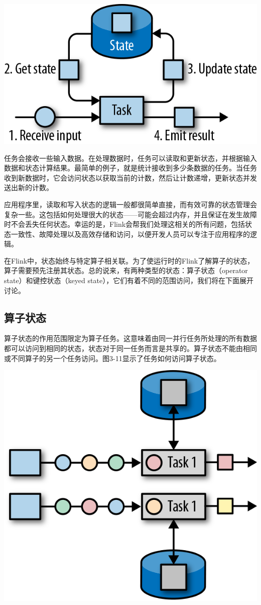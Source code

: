 \documentclass[cn,11pt,chinese]{elegantbook}
\begin{document}
\includegraphics{images/spaf_0310.png}

任务会接收一些输入数据。在处理数据时，任务可以读取和更新状态，并根据输入数据和状态计算结果。最简单的例子，就是统计接收到多少条数据的任务。当任务收到新数据时，它会访问状态以获取当前的计数，然后让计数递增，更新状态并发送出新的计数。

应用程序里，读取和写入状态的逻辑一般都很简单直接，而有效可靠的状态管理会复杂一些。这包括如何处理很大的状态------可能会超过内存，并且保证在发生故障时不会丢失任何状态。幸运的是，Flink会帮我们处理这相关的所有问题，包括状态一致性、故障处理以及高效存储和访问，以便开发人员可以专注于应用程序的逻辑。

在Flink中，状态始终与特定算子相关联。为了使运行时的Flink了解算子的状态，算子需要预先注册其状态。总的说来，有两种类型的状态：算子状态（operator
state）和键控状态（keyed
state），它们有着不同的范围访问，我们将在下面展开讨论。

\hypertarget{ux7b97ux5b50ux72b6ux6001}{%
\subsection{算子状态}\label{ux7b97ux5b50ux72b6ux6001}}

算子状态的作用范围限定为算子任务。这意味着由同一并行任务所处理的所有数据都可以访问到相同的状态，状态对于同一任务而言是共享的。算子状态不能由相同或不同算子的另一个任务访问。图3-11显示了任务如何访问算子状态。

\includegraphics{images/spaf_0311.png}
\end{document}
